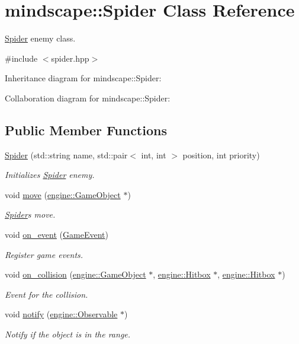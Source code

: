 \hypertarget{classmindscape_1_1_spider}{}\section{mindscape\+:\+:Spider Class Reference}
\label{classmindscape_1_1_spider}


\hyperlink{classmindscape_1_1_spider}{Spider} enemy class.  




{\ttfamily \#include $<$spider.\+hpp$>$}



Inheritance diagram for mindscape\+:\+:Spider\+:


Collaboration diagram for mindscape\+:\+:Spider\+:
\subsection*{Public Member Functions}
\begin{DoxyCompactItemize}
\item 
\hyperlink{classmindscape_1_1_spider_a704f3d4f21322710c18928e0a1e9437d}{Spider} (std\+::string name, std\+::pair$<$ int, int $>$ position, int priority)
\begin{DoxyCompactList}\small\item\em Initializes \hyperlink{classmindscape_1_1_spider}{Spider} enemy. \end{DoxyCompactList}\item 
void \hyperlink{classmindscape_1_1_spider_aff8def99a1891b772563409c1098b16e}{move} (\hyperlink{classengine_1_1_game_object}{engine\+::\+Game\+Object} $\ast$)
\begin{DoxyCompactList}\small\item\em \hyperlink{classmindscape_1_1_spider}{Spider}\textquotesingle{}s move. \end{DoxyCompactList}\item 
void \hyperlink{classmindscape_1_1_spider_a68e38dcd9353ec245ac984566671fd40}{on\+\_\+event} (\hyperlink{class_game_event}{Game\+Event})
\begin{DoxyCompactList}\small\item\em Register game events. \end{DoxyCompactList}\item 
void \hyperlink{classmindscape_1_1_spider_a388cb275593530dca18cf48ad68bf8ae}{on\+\_\+collision} (\hyperlink{classengine_1_1_game_object}{engine\+::\+Game\+Object} $\ast$, \hyperlink{classengine_1_1_hitbox}{engine\+::\+Hitbox} $\ast$, \hyperlink{classengine_1_1_hitbox}{engine\+::\+Hitbox} $\ast$)
\begin{DoxyCompactList}\small\item\em Event for the collision. \end{DoxyCompactList}\item 
void \hyperlink{classmindscape_1_1_spider_a4f88179ed3a8055f076fa916bf60d967}{notify} (\hyperlink{classengine_1_1_observable}{engine\+::\+Observable} $\ast$)
\begin{DoxyCompactList}\small\item\em Notify if the object is in the range. \end{DoxyCompactList}\end{DoxyCompactItemize}

